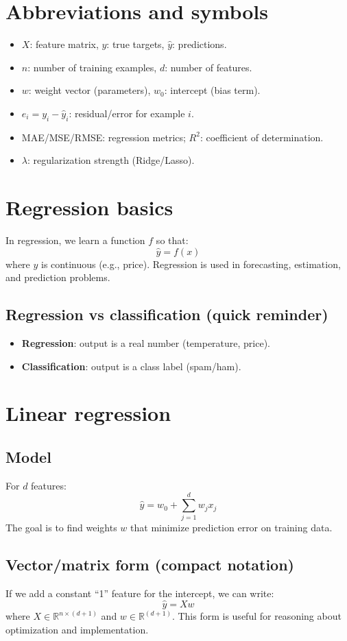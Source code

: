 \documentclass[11pt]{article}
\begin{document}
\section{Abbreviations and symbols}
\begin{itemize}[leftmargin=*]
  \item $X$: feature matrix, $y$: true targets, $\hat{y}$: predictions.
  \item $n$: number of training examples, $d$: number of features.
  \item $w$: weight vector (parameters), $w_0$: intercept (bias term).
  \item $e_i = y_i - \hat{y}_i$: residual/error for example $i$.
  \item MAE/MSE/RMSE: regression metrics; $R^2$: coefficient of determination.
  \item $\lambda$: regularization strength (Ridge/Lasso).
\end{itemize}

\section{Regression basics}
In regression, we learn a function $f$ so that:
\[
  \hat{y} = f(x)
\]
where $y$ is continuous (e.g., price). Regression is used in forecasting, estimation, and prediction problems.

\subsection{Regression vs classification (quick reminder)}
\begin{itemize}[leftmargin=*]
  \item \textbf{Regression}: output is a real number (temperature, price).
  \item \textbf{Classification}: output is a class label (spam/ham).
\end{itemize}

\section{Linear regression}
\subsection{Model}
For $d$ features:
\[
  \hat{y} = w_0 + \sum_{j=1}^{d} w_j x_j
\]
The goal is to find weights $w$ that minimize prediction error on training data.

\subsection{Vector/matrix form (compact notation)}
If we add a constant ``1'' feature for the intercept, we can write:
\[
  \hat{y} = X w
\]
where $X \in \mathbb{R}^{n \times (d+1)}$ and $w \in \mathbb{R}^{(d+1)}$.
This form is useful for reasoning about optimization and implementation.
\end{document}
